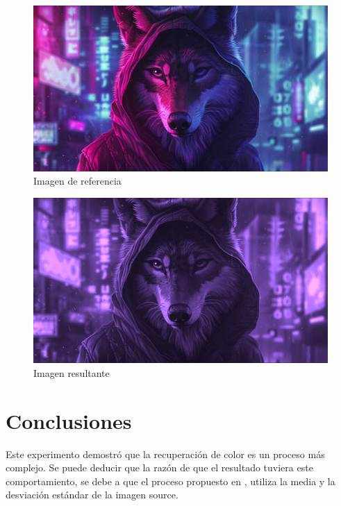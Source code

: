 \documentclass[10pt]{IEEEtran}
\begin{document}
    \begin{figure}[ht]
      \centering
      \includegraphics[width=0.8\linewidth]{res/Reference.png}
      \caption{Imagen de referencia}
    \end{figure}

    \begin{figure}[ht]
      \centering
      \includegraphics[width=0.8\linewidth]{res/Transfer.png}
      \caption{Imagen resultante}
    \end{figure}

  \section{Conclusiones}
  Este experimento demostró que la recuperación de color es un proceso más complejo. Se puede deducir que la
  razón de que el resultado tuviera este comportamiento, se debe a que el proceso propuesto en \cite{Reinhard2001},
  utiliza la media y la desviación estándar de la imagen source.

  \printbibliography
\end{document}
